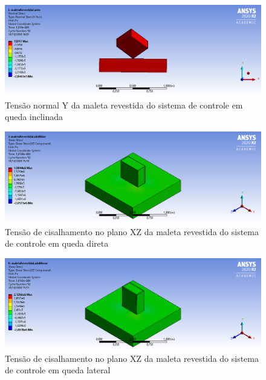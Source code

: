 \begin{apendicesenv}
\begin{figure}[htb]
    \centering
    \includegraphics[width=1.0\textwidth, angle=0]{figuras/estrutura_simulacaoImpacto/maletaRevestidaNormalYCanto.png}
    \caption{Tensão normal Y da maleta revestida do sistema de controle em queda inclinada}
    \label{fig:simulacaoImpacto_30}
\end{figure}

\begin{figure}[htb]
    \centering
    \includegraphics[width=1.0\textwidth, angle=0]{figuras/estrutura_simulacaoImpacto/maletaRevestidaCisalhamentoXZMaior.png}
    \caption{Tensão de cisalhamento no plano XZ da maleta revestida do sistema de controle em queda direta}
    \label{fig:simulacaoImpacto_31}
\end{figure}

\begin{figure}[htb]
    \centering
    \includegraphics[width=1.0\textwidth, angle=0]{figuras/estrutura_simulacaoImpacto/maletaRevestidaCisalhamentoXZMenor.png}
    \caption{Tensão de cisalhamento no plano XZ da maleta revestida do sistema de controle em queda lateral}
    \label{fig:simulacaoImpacto_32}
\end{figure}


\end{apendicesenv}
